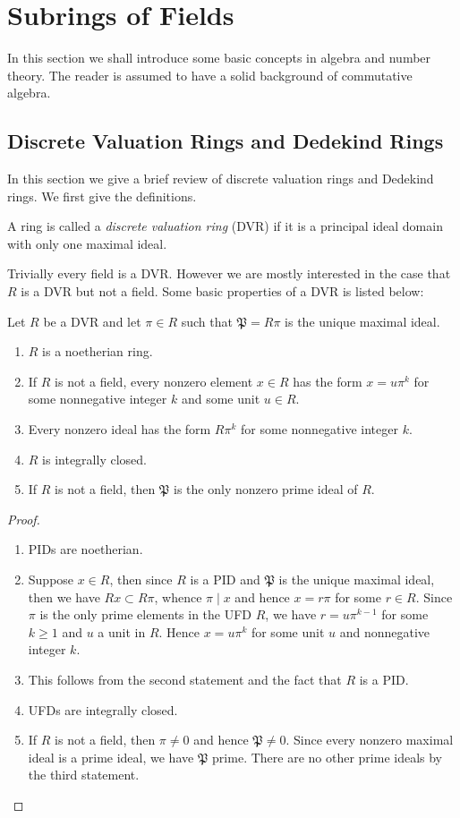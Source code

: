 \section{Subrings of Fields}
In this section we shall introduce some basic concepts in algebra and number theory. The reader is assumed to have a solid background of commutative algebra.
\subsection{Discrete Valuation Rings and Dedekind Rings}
In this section we give a brief review of discrete valuation rings and Dedekind rings. We first give the definitions.
\begin{definition}
A ring is called a \textit{discrete valuation ring} (DVR) if it is a principal ideal domain with only one maximal ideal.
\end{definition}
Trivially every field is a DVR. However we are mostly interested in the case that $R$ is a DVR but not a field. Some basic properties of a DVR is listed below:
\begin{proposition}
Let $R$ be a DVR and let $\pi\in R$ such that $\mathfrak{P}=R\pi$ is the unique maximal ideal.
\begin{enumerate}
    \item $R$ is a noetherian ring.
    \item If $R$ is not a field, every nonzero element $x\in R$ has the form $x=u\pi^k$ for some nonnegative integer $k$ and some unit $u\in R$.
    \item Every nonzero ideal has the form $R\pi^k$ for some nonnegative integer $k$.
    \item $R$ is integrally closed.
    \item If $R$ is not a field, then $\mathfrak{P}$ is the only nonzero prime ideal of $R$.
\end{enumerate}
\end{proposition}
\begin{proof}
\begin{enumerate}
    \item PIDs are noetherian.
    \item Suppose $x\in R$, then since $R$ is a PID and $\mathfrak{P}$ is the unique maximal ideal, then we have $Rx\subset R\pi$, whence $\pi\mid x$ and hence $x=r\pi$ for some $r\in R$. Since $\pi$ is the only prime elements in the UFD $R$, we have $r=u\pi^{k-1}$ for some $k\ge 1$ and $u$ a unit in $R$. Hence $x=u\pi^{k}$ for some unit $u$ and nonnegative integer $k$.
    \item This follows from the second statement and the fact that $R$ is a PID.
    \item UFDs are integrally closed.
    \item If $R$ is not a field, then $\pi\ne 0$ and hence $\mathfrak{P}\ne 0$. Since every nonzero maximal ideal is a prime ideal, we have $\mathfrak{P}$ prime. There are no other prime ideals by the third statement.
\end{enumerate}
\end{proof}
